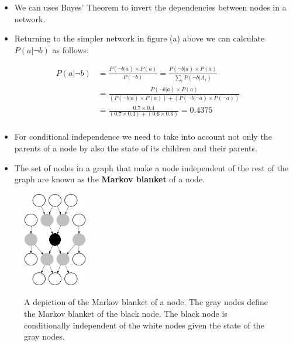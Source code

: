 \documentclass[xcolor={table}]{beamer}
\newcommand{\keyword}[1]{\alert{\textbf{#1}}\index{#1}}
\begin{document}
 \begin{frame} 
 \begin{itemize}
 	\item We can uses Bayes' Theorem to invert the dependencies between nodes in a network.
	\item Returning to the simpler network in figure (a) above we can calculate $P(a|\lnot b)$ as follows:
\end{itemize}
\begin{align*}
P(a|\lnot b) &= \frac{P(\lnot b | a) \times P(a)}{P(\lnot b)} = \frac{P(\lnot b | a) \times P(a)}{\sum_i P(\lnot b|A_i)}\\
&= \frac{P(\lnot b | a) \times P(a)}{\left(P(\lnot b|a)\times P(a)\right) + \left(P(\lnot b|\lnot a)\times P(\lnot a)\right)}\\
&= \frac{0.7 \times 0.4}{\left(0.7\times 0.4\right) + \left(0.6\times 0.6\right)}=0.4375\\
\end{align*}
\end{frame} 

\begin{frame}
	\begin{itemize}
		\item For conditional independence we need to take into account not only the parents of a node by also the state of its children and their parents.
		\item The set of nodes in a graph that make a node independent of the rest of the graph are known as the \keyword{Markov blanket} of a node.
	\end{itemize}
\end{frame}

 \begin{frame} 
\begin{figure}
\centering
\includegraphics[width=0.25\textwidth]{./images/markovblanket.pdf}\\
\caption{A depiction of the Markov blanket of a node. The gray nodes define the Markov blanket of the black node. The black node is conditionally independent of the white nodes given the state of the gray nodes.}
\label{fig:markovblanket}
\end{figure}
\end{frame} 
\end{document}

